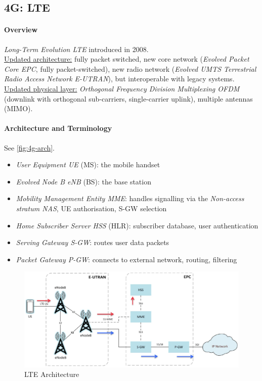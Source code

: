 \subsection{4G: LTE}

\paragraph{Overview}
\textit{Long-Term Evolution LTE} introduced in 2008.
\\
\underline{Updated architecture:}
fully packet switched, new core network (\textit{Evolved Packet Core EPC}, fully packet-switched), new radio network (\textit{Evolved UMTS Terrestrial Radio Access Network E-UTRAN}), but interoperable with legacy systems.
\\
\underline{Updated physical layer:}
\textit{Orthogonal Frequency Division Multiplexing OFDM} (downlink with orthogonal sub-carriers, single-carrier uplink), multiple antennas (MIMO).

\paragraph{Architecture and Terminology}
See \autoref{fig:4g-arch}.
\begin{itemize}
	\item \textit{User Equipment UE} (MS): the mobile handset
	\item \textit{Evolved Node B eNB} (BS): the base station
	\item \textit{Mobility Management Entity MME}: handles signalling via the \textit{Non-access stratum NAS}, UE authorisation, S-GW selection
	\item \textit{Home Subscriber Server HSS} (HLR): subscriber database, user authentication
	\item \textit{Serving Gateway S-GW}:  routes user data packets
	\item \textit{Packet Gateway P-GW}: connects to external network, routing, filtering
\end{itemize}

\begin{figure}
	\centering
	\includegraphics[scale=0.5]{images/10-4g-arch.png}
	\caption{LTE Architecture}
	\label{fig:4g-arch}
\end{figure}


